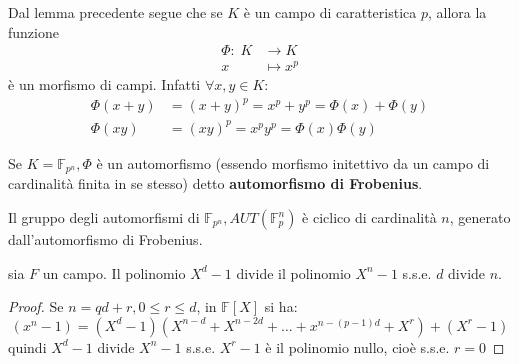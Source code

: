 \documentclass[../main.tex]{subfiles}
\begin{document}
\begin{definition}
    Dal lemma precedente segue che se $K$ è un campo di caratteristica $p$, allora la funzione
    \begin{align*}
        \Phi : \; K & \rightarrow K \\
        x           & \mapsto x^p
    \end{align*}
    è un morfismo di campi. Infatti $\forall x,y \in K$:
    \begin{align*}
        \Phi(x + y) & = (x + y)^p = x^p + y^p = \Phi(x) + \Phi(y) \\
        \Phi(xy)    & = (xy)^p = x^p y^p = \Phi(x) \Phi(y)
    \end{align*}

    Se $K = \mathbb{F}_{p^n}, \Phi$ è un automorfismo (essendo morfismo initettivo da un campo di cardinalità finita in se stesso) detto \textbf{automorfismo di Frobenius}.
\end{definition}

\begin{theorem}
    Il gruppo degli automorfismi di $\mathbb{F}_{p^n}, AUT(\mathbb{F}_p^n)$ è ciclico di cardinalità $n$, generato dall'automorfismo di Frobenius.
\end{theorem}

\begin{lemma}
    sia $F$ un campo. Il polinomio $X^d - 1$ divide il polinomio $X^n - 1$ s.s.e. $d$ divide $n$.
\end{lemma}
\begin{proof}
    Se $n = qd + r, 0 \leq r \leq d$, in $\mathbb{F}[X]$ si ha:
    \begin{equation*}
        (x^n - 1) = (X^d - 1)(X^{n-d} + X^{n-2d} + \ldots + x^{n-(p-1)d} + X^r) + (X^r -1)
    \end{equation*}
    quindi $X^d - 1$ divide $X^n - 1$ s.s.e. $X^r - 1$ è il polinomio nullo, cioè s.s.e. $r = 0$
\end{proof}
\end{document}
